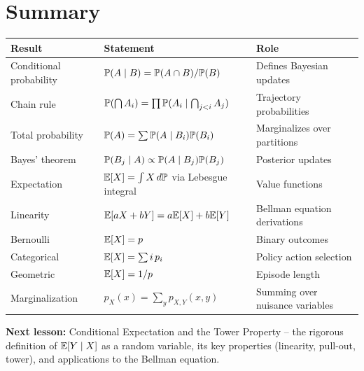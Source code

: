 \documentclass[11pt,a4paper]{article}
\begin{document}

\section{Summary}
\label{sec:summary}

\begin{center}
\renewcommand{\arraystretch}{1.4}
\begin{tabular}{p{4cm} p{5.5cm} p{4.5cm}}
\toprule
\textbf{Result} & \textbf{Statement} & \textbf{Role} \\
\midrule
Conditional probability &
  $\mathbb{P}(A \mid B) = \mathbb{P}(A \cap B)/\mathbb{P}(B)$ &
  Defines Bayesian updates \\
Chain rule &
  $\mathbb{P}(\bigcap A_i) = \prod \mathbb{P}(A_i \mid \bigcap_{j<i} A_j)$ &
  Trajectory probabilities \\
Total probability &
  $\mathbb{P}(A) = \sum \mathbb{P}(A \mid B_i)\mathbb{P}(B_i)$ &
  Marginalizes over partitions \\
Bayes' theorem &
  $\mathbb{P}(B_j \mid A) \propto \mathbb{P}(A \mid B_j)\mathbb{P}(B_j)$ &
  Posterior updates \\
Expectation &
  $\mathbb{E}[X] = \int X\, d\mathbb{P}$ via Lebesgue integral &
  Value functions \\
Linearity &
  $\mathbb{E}[aX + bY] = a\mathbb{E}[X] + b\mathbb{E}[Y]$ &
  Bellman equation derivations \\
Bernoulli & $\mathbb{E}[X] = p$ & Binary outcomes \\
Categorical & $\mathbb{E}[X] = \sum i\, p_i$ & Policy action selection \\
Geometric & $\mathbb{E}[X] = 1/p$ & Episode length \\
Marginalization &
  $p_X(x) = \sum_y p_{X,Y}(x,y)$ &
  Summing over nuisance variables \\
\bottomrule
\end{tabular}
\end{center}

\medskip
\noindent\textbf{Next lesson:} Conditional Expectation and the Tower
Property -- the rigorous definition of $\mathbb{E}[Y \mid X]$ as a random
variable, its key properties (linearity, pull-out, tower), and
applications to the Bellman equation.


\end{document}
